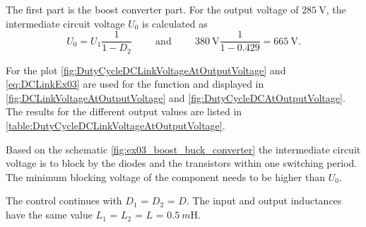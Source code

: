 
\begin{solutionblock}
    The first part is the boost converter part. For the output voltage 
    of $\SI{285}{\volt}$, the intermediate circuit voltage $U_\mathrm{0}$ is calculated as
    \begin{equation}
        U_\mathrm{0}=U_\mathrm{1} \frac{1}{1-D_\mathrm{2}} 
        \hspace{1cm} \mathrm{and} \hspace{1cm}  
        \SI{380}{\volt} \frac{1}{1-0.429} = \SI{665}{\volt}.
        \label{eq:DCLinkEx03}        
    \end{equation}
\end{solutionblock}



\begin{solutionblock}
    For the plot \eqref{fig:DutyCycleDCLinkVoltageAtOutputVoltage} and \eqref{eq:DCLinkEx03} are used for the function and 
    displayed in \autoref{fig:DCLinkVoltageAtOutputVoltage} and \autoref{fig:DutyCycleDCAtOutputVoltage}. The results for the different output values are listed in \autoref{table:DutyCycleDCLinkVoltageAtOutputVoltage}.

    
    


    
\end{solutionblock}


\begin{solutionblock}
    Based on the schematic \autoref{fig:ex03_boost_buck_converter} the intermediate circuit voltage is to block by the diodes and 
    the transistors within one switching period. The minimum blocking voltage of the component needs to be higher than $U_\mathrm{0}$.
\end{solutionblock}

\vspace{2em}\par
The control continues with $D_\mathrm{1}$ = $D_\mathrm{2}$ = $D$. The input and output inductances 
have the same value $L_\mathrm{1}$ = $L_\mathrm{2}$ = $L$ = $\SI{0.5}{m\henry}$.

